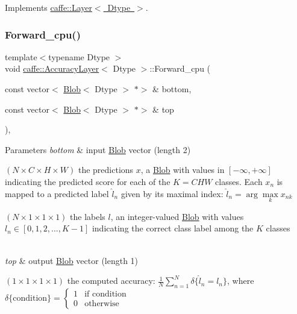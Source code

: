 Implements \mbox{\hyperlink{classcaffe_1_1_layer_a576ac6a60b1e99fe383831f52a6cea77}{caffe\+::\+Layer$<$ Dtype $>$}}.

\mbox{\label{classcaffe_1_1_accuracy_layer_ad61bb4c6984d9df6a61562cd5c19ff6d}} 
\subsubsection{\texorpdfstring{Forward\+\_\+cpu()}{Forward\_cpu()}\hspace{0.1cm}{\footnotesize\ttfamily [2/2]}}
{\footnotesize\ttfamily template$<$typename Dtype $>$ \\
void \mbox{\hyperlink{classcaffe_1_1_accuracy_layer}{caffe\+::\+Accuracy\+Layer}}$<$ Dtype $>$\+::Forward\+\_\+cpu (\begin{DoxyParamCaption}\item[{const vector$<$ \mbox{\hyperlink{classcaffe_1_1_blob}{Blob}}$<$ Dtype $>$ $\ast$$>$ \&}]{bottom,  }\item[{const vector$<$ \mbox{\hyperlink{classcaffe_1_1_blob}{Blob}}$<$ Dtype $>$ $\ast$$>$ \&}]{top }\end{DoxyParamCaption})\hspace{0.3cm}{\ttfamily [protected]}, {\ttfamily [virtual]}}


\begin{DoxyParams}{Parameters}
{\em bottom} & input \mbox{\hyperlink{classcaffe_1_1_blob}{Blob}} vector (length 2)
\begin{DoxyEnumerate}
\item $ (N \times C \times H \times W) $ the predictions $ x $, a \mbox{\hyperlink{classcaffe_1_1_blob}{Blob}} with values in $ [-\infty, +\infty] $ indicating the predicted score for each of the $ K = CHW $ classes. Each $ x_n $ is mapped to a predicted label $ \hat{l}_n $ given by its maximal index\+: $ \hat{l}_n = \arg\max\limits_k x_{nk} $
\item $ (N \times 1 \times 1 \times 1) $ the labels $ l $, an integer-\/valued \mbox{\hyperlink{classcaffe_1_1_blob}{Blob}} with values $ l_n \in [0, 1, 2, ..., K - 1] $ indicating the correct class label among the $ K $ classes 
\end{DoxyEnumerate}\\
\hline
{\em top} & output \mbox{\hyperlink{classcaffe_1_1_blob}{Blob}} vector (length 1)
\begin{DoxyEnumerate}
\item $ (1 \times 1 \times 1 \times 1) $ the computed accuracy\+: $ \frac{1}{N} \sum\limits_{n=1}^N \delta\{ \hat{l}_n = l_n \} $, where $ \delta\{\mathrm{condition}\} = \left\{ \begin{array}{lr} 1 & \mbox{if condition} \\ 0 & \mbox{otherwise} \end{array} \right. $ 
\end{DoxyEnumerate}\\
\hline
\end{DoxyParams}


